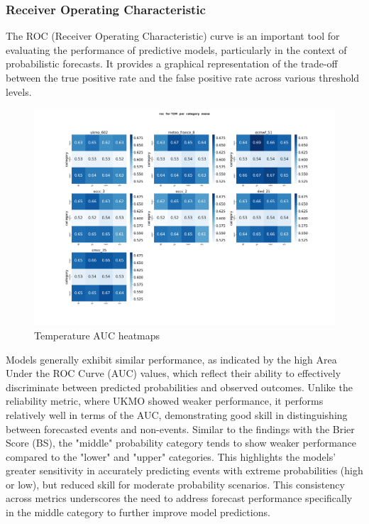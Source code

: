 \subsubsection{Receiver Operating Characteristic}
The ROC (Receiver Operating Characteristic) curve is an important tool for evaluating the performance of predictive models, particularly in the context of probabilistic forecasts. It provides a graphical representation of the trade-off between the true positive rate  and the false positive rate  across various threshold levels.

\begin{figure}[H]
    \centering
    \includegraphics[width=1\linewidth]{plots/prob/roc/roc_T2M_category_mena.png}
    \caption{Temperature AUC  heatmaps }
    \label{fig:CORR_djf_t2m}
\end{figure}


Models generally exhibit similar performance, as indicated by the high Area Under the ROC Curve (AUC) values, which reflect their ability to effectively discriminate between predicted probabilities and observed outcomes. Unlike the reliability metric, where UKMO showed weaker performance, it performs relatively well in terms of the AUC, demonstrating good skill in distinguishing between forecasted events and non-events. Similar to the findings with the Brier Score (BS), the "middle" probability category tends to show weaker performance compared to the "lower" and "upper" categories. This highlights the models' greater sensitivity in accurately predicting events with extreme probabilities (high or low), but reduced skill for moderate probability scenarios. This consistency across metrics underscores the need to address forecast performance specifically in the middle category to further improve model predictions.


